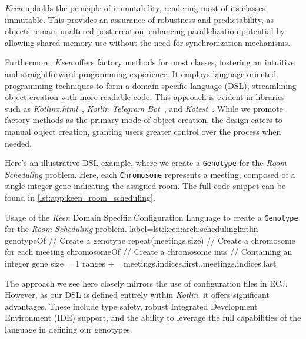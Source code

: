   \textit{Keen} upholds the principle of immutability, rendering most of its
  classes immutable.
  This provides an assurance of robustness and predictability, as objects remain
  unaltered post-creation, enhancing parallelization potential by allowing
  shared memory use without the need for synchronization mechanisms.

  Furthermore, \textit{Keen} offers factory methods for most classes, fostering 
  an intuitive and straightforward programming experience.
  It employs language-oriented programming techniques to form a domain-specific 
  language (DSL), streamlining object creation with more readable code.
  This approach is evident in libraries such as 
  \textit{Kotlinx.html}~\autocite{KotlinxHtml2023}, 
  \textit{Kotlin Telegram Bot}~\autocite{KotlinTelegramBot2023}, and 
  \textit{Kotest}~\autocite{KotestKotesta}.
  While we promote factory methods as the primary mode of object creation, the 
  design caters to manual object creation, granting users greater control over 
  the process when needed.


  Here's an illustrative DSL example, where we create a \texttt{Genotype} for
  the \textit{Room Scheduling} problem.
  Here, each \texttt{Chromosome} represents a meeting, composed of a single
  integer gene indicating the assigned room. The full code snippet can be found 
  in \vref{lst:app:keen_room_scheduling}.

  \begin{code}{
      Usage of the \textit{Keen} Domain Specific Configuration Language to create a \texttt{Genotype} for the 
      \textit{Room Scheduling} problem.
  }{label={lst:keen:arch:scheduling}}{kotlin}
    genotypeOf {                // Create a genotype
        repeat(meetings.size) { // Create a chromosome for each meeting
            chromosomeOf {      // Create a chromosome
                ints {          // Containing an integer gene
                    size = 1    
                    ranges += meetings.indices.first..meetings.indices.last
                }
            }
        }
    }
  \end{code}

  The approach we see here closely mirrors the use of configuration files in 
  ECJ.
  However, as our DSL is defined entirely within \textit{Kotlin}, it offers 
  significant advantages.
  These include type safety, robust Integrated Development Environment (IDE) 
  support, and the ability to leverage the full capabilities of the language 
  in defining our genotypes.

